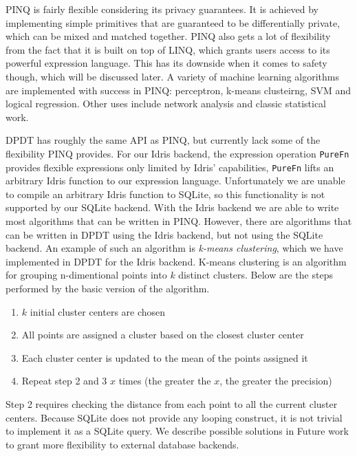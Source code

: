 \documentclass[12pt]{article}
\begin{document}
PINQ is fairly flexible considering its privacy guarantees.
It is achieved by implementing simple primitives that are guaranteed to be differentially private, which can be mixed and matched together.
PINQ also gets a lot of flexibility from the fact that it is built on top of LINQ, which grants users access to its powerful expression language.
This has its downside when it comes to safety though, which will be discussed later.
A variety of machine learning algorithms are implemented with success in PINQ: perceptron, k-means clusteirng, SVM and logical regression.
Other uses include network analysis and classic statistical work.

DPDT has roughly the same API as PINQ, but currently lack some of the flexibility PINQ provides.
For our Idris backend, the expression operation \texttt{PureFn} provides flexible expressions only limited by Idris' capabilities,
\texttt{PureFn} lifts an arbitrary Idris function to our expression language.
Unfortunately we are unable to compile an arbitrary Idris function to SQLite, so this functionality is not supported by our SQLite backend.
With the Idris backend we are able to write most algorithms that can be written in PINQ.
However, there are algorithms that can be written in DPDT using the Idris backend, but not using the SQLite backend.
An example of such an algorithm is \textit{k-means clustering}, which we have implemented in DPDT for the Idris backend.
K-means clustering is an algorithm for grouping n-dimentional points into $k$ distinct clusters.
Below are the steps performed by the basic version of the algorithm.

\begin{enumerate}
	\item $k$ initial cluster centers are chosen
	\item All points are assigned a cluster based on the closest cluster center 
	\item Each cluster center is updated to the mean of the points assigned it
	\item Repeat step 2 and 3 $x$ times (the greater the $x$, the greater the precision)
\end{enumerate}

Step 2 requires checking the distance from each point to all the current cluster centers.
Because SQLite does not provide any looping construct, it is not trivial to implement it as a SQLite query.
We describe possible solutions in Future work to grant more flexibility to external database backends.
\end{document}
